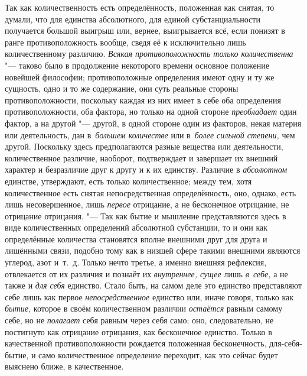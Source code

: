 \label{bkm:bm69a}Так как количественность есть определённость, положенная как
снятая, то думали, что для единства абсолютного, для единой субстанциальности
получается большой выигрыш или, вернее, выигрывается всё, если понизят в ранге
противоположность вообще, сведя её к исключительно лишь количественному
различию. {\em Всякая противоположность только количественна} "--- таково было
в продолжение некоторого времени основное положение новейшей
философии; противоположные определения
имеют одну и ту же сущность, одно и то же содержание, они суть реальные стороны
противоположности, поскольку каждая из них имеет в себе оба определения
противоположности, оба фактора, но только на одной стороне {\em преобладает}
один фактор, а на другой "--- другой, в одной стороне один из факторов, некая
материя или деятельность, дан в~{\em большем количестве} или
в~{\em более сильной степени,} чем другой. Поскольку здесь предполагаются
разные вещества или деятельности, количественное различие, наоборот,
подтверждает и завершает их внешний характер и безразличие друг к другу и к их
единству. Различие в {\em абсолютном} единстве, утверждают, есть только
количественное; между тем, хотя количественное есть снятая непосредственная
определённость, оно, однако, есть лишь несовершенное, лишь {\em первое}
отрицание, а не бесконечное отрицание, не отрицание отрицания. "--- Так как
бытие и мышление представляются здесь в виде количественных определений
абсолютной субстанции, то и они как определённые количества становятся вполне
внешними друг для друга и лишёнными связи, подобно тому как в низшей сфере
такими внешними являются углерод, азот и~т.~д. Только нечто третье, а именно
внешняя рефлексия, отвлекается от их различия и познаёт их
{\em внутреннее, сущее} лишь {\em в~себе,} а не также и {\em для себя}
единство. Стало быть, на самом деле это единство представляют себе лишь как
первое {\em непосредственное} единство или, иначе говоря, только как
{\em бытие,} которое в своём количественном различии {\em остаётся} равным
самому себе, но не {\em полагает} себя равным через себя само; оно,
следовательно, не постигнуто как отрицание отрицания, как бесконечное единство.
Только в качественной противоположности рождается положенная бесконечность,
для-себя-бытие, и само количественное определение переходит, как это сейчас
будет выяснено ближе, в качественное.

\bigskip

